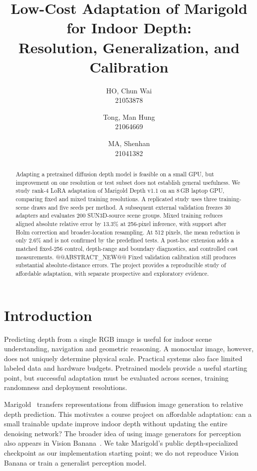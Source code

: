 \documentclass[10pt,twocolumn,letterpaper]{article}
\title{Low-Cost Adaptation of Marigold for Indoor Depth:\\Resolution, Generalization, and Calibration}
\author{HO, Chun Wai\\21053878\and Tong, Man Hung\\21064669\and MA, Shenhan\\21041382}
\begin{document}
\maketitle
\begin{abstract}
Adapting a pretrained diffusion depth model is feasible on a small GPU, but improvement on one resolution or test subset does not establish general usefulness. We study rank-4 LoRA adaptation of Marigold Depth v1.1 on an 8\,GB laptop GPU, comparing fixed and mixed training resolutions. A replicated study uses three training-scene draws and five seeds per method. A subsequent external validation freezes 30 adapters and evaluates 200 SUN3D-source scene groups. Mixed training reduces aligned absolute relative error by 13.3\% at 256-pixel inference, with support after Holm correction and broader-location resampling. At 512 pixels, the mean reduction is only 2.6\% and is not confirmed by the predefined tests. A post-hoc extension adds a matched fixed-256 control, depth-range and boundary diagnostics, and controlled cost measurements. @@ABSTRACT_NEW@@ Fixed validation calibration still produces substantial absolute-distance errors. The project provides a reproducible study of affordable adaptation, with separate prospective and exploratory evidence.
\end{abstract}

\section{Introduction}
Predicting depth from a single RGB image is useful for indoor scene understanding, navigation and geometric reasoning. A monocular image, however, does not uniquely determine physical scale. Practical systems also face limited labeled data and hardware budgets. Pretrained models provide a useful starting point, but successful adaptation must be evaluated across scenes, training randomness and deployment resolutions.

Marigold~\cite{marigold,marigold25} transfers representations from diffusion image generation to relative depth prediction. This motivates a course project on affordable adaptation: can a small trainable update improve indoor depth without updating the entire denoising network? The broader idea of using image generators for perception also appears in Vision Banana~\cite{banana}. We take Marigold's public depth-specialized checkpoint as our implementation starting point; we do not reproduce Vision Banana or train a generalist perception model.
\end{document}
